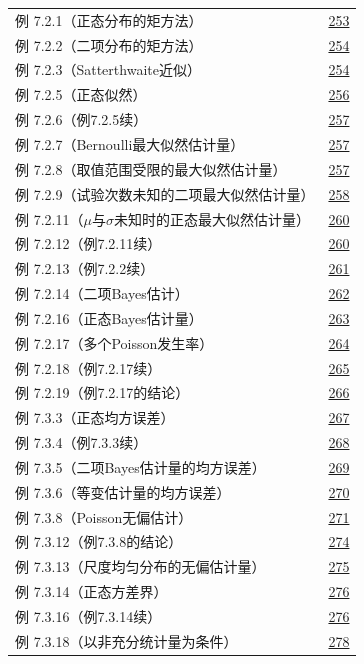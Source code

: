 \begin{longtable}{@{}p{}r@{}}
\addlinespace[.5em]
例 7.2.1（正态分布的矩方法） & \hyperref[ex:7.2.1]{253} \\
例 7.2.2（二项分布的矩方法） & \hyperref[ex:7.2.2]{254} \\
例 7.2.3（Satterthwaite近似） & \hyperref[ex:7.2.3]{254} \\
例 7.2.5（正态似然） & \hyperref[ex:7.2.5]{256} \\
例 7.2.6（例7.2.5续） & \hyperref[ex:7.2.6]{257} \\
例 7.2.7（Bernoulli最大似然估计量） & \hyperref[ex:7.2.7]{257} \\
例 7.2.8（取值范围受限的最大似然估计量） & \hyperref[ex:7.2.8]{257} \\
例 7.2.9（试验次数未知的二项最大似然估计量） & \hyperref[ex:7.2.9]{258} \\
例 7.2.11（$\mu$与$\sigma$未知时的正态最大似然估计量） & \hyperref[ex:7.2.11]{260} \\
例 7.2.12（例7.2.11续） & \hyperref[ex:7.2.12]{260} \\
例 7.2.13（例7.2.2续） & \hyperref[ex:7.2.13]{261} \\
例 7.2.14（二项Bayes估计） & \hyperref[ex:7.2.14]{262} \\
例 7.2.16（正态Bayes估计量） & \hyperref[ex:7.2.16]{263} \\
例 7.2.17（多个Poisson发生率） & \hyperref[ex:7.2.17]{264} \\
例 7.2.18（例7.2.17续） & \hyperref[ex:7.2.18]{265} \\
例 7.2.19（例7.2.17的结论） & \hyperref[ex:7.2.19]{266} \\
例 7.3.3（正态均方误差） & \hyperref[ex:7.3.3]{267} \\
例 7.3.4（例7.3.3续） & \hyperref[ex:7.3.4]{268} \\
例 7.3.5（二项Bayes估计量的均方误差） & \hyperref[ex:7.3.5]{269} \\
例 7.3.6（等变估计量的均方误差） & \hyperref[ex:7.3.6]{270} \\
例 7.3.8（Poisson无偏估计） & \hyperref[ex:7.3.8]{271} \\
例 7.3.12（例7.3.8的结论） & \hyperref[ex:7.3.12]{274} \\
例 7.3.13（尺度均匀分布的无偏估计量） & \hyperref[ex:7.3.13]{275} \\
例 7.3.14（正态方差界） & \hyperref[ex:7.3.14]{276} \\
例 7.3.16（例7.3.14续） & \hyperref[ex:7.3.16]{276} \\
例 7.3.18（以非充分统计量为条件） & \hyperref[ex:7.3.18]{278} \\

\end{longtable}
